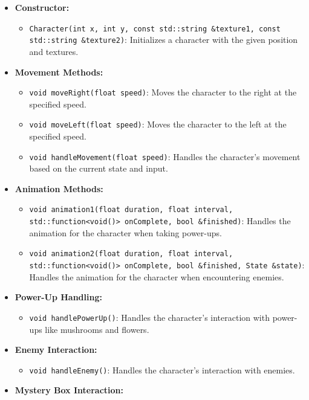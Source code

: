 \begin{itemize}
    \item \textbf{Constructor:}
    \begin{itemize}
        \item \texttt{Character(int x, int y, 
        const std::string \&texture1, const std::string \&texture2)}: Initializes a character with the given position and textures.
    \end{itemize}
    \item \textbf{Movement Methods:}
    \begin{itemize}
        \item \texttt{void moveRight(float speed)}: Moves the character to the right at the specified speed.
        \item \texttt{void moveLeft(float speed)}: Moves the character to the left at the specified speed.
        \item \texttt{void handleMovement(float speed)}: Handles the character's movement based on the current state and input.
    \end{itemize}
    \item \textbf{Animation Methods:}
    \begin{itemize}
        \item \texttt{void animation1(float duration, float interval, std::function<void()> onComplete, bool \&finished)}: Handles the animation for the character when taking power-ups.
        \item \texttt{void animation2(float duration, float interval, std::function<void()> onComplete, bool \&finished, State \&state)}: Handles the animation for the character when encountering enemies.
    \end{itemize}
    \item \textbf{Power-Up Handling:}
    \begin{itemize}
        \item \texttt{void handlePowerUp()}: Handles the character's interaction with power-ups like mushrooms and flowers.
    \end{itemize}
    \item \textbf{Enemy Interaction:}
    \begin{itemize}
        \item \texttt{void handleEnemy()}: Handles the character's interaction with enemies.
    \end{itemize}
    \item \textbf{Mystery Box Interaction:}
    \begin{itemize}

\end{itemize}
\end{itemize}
